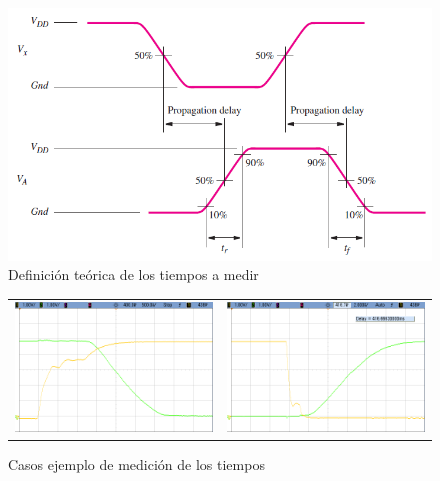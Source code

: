 \begin{figure}[H]
    \centering
        \includegraphics[scale=0.6]{../EJ1/Recursos/time_logic.PNG}
    \caption{Definici\'on te\'orica de los tiempos a medir}
    \label{fig:time_logic}
\end{figure}

\begin{figure}[H]
    \centering
        \begin{tabular}{c c}
            \includegraphics[scale=0.20]{../EJ1/Mediciones/Osciloscopio/Segundo_Intento/Times_RTL/cropped_scope_37.png} &
            \includegraphics[scale=0.20]{../EJ1/Mediciones/Osciloscopio/Segundo_Intento/Times_RTL/cropped_scope_39.png}
        \end{tabular}
    \caption{Casos ejemplo de medici\'on de los tiempos}
    \label{fig:operation_times}
\end{figure}

